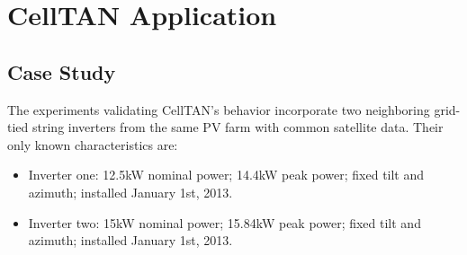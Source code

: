 \chapter{CellTAN Application} \label{chap:chap5}


\section{Case Study}


The experiments validating CellTAN's behavior incorporate two neighboring grid-tied string inverters from the same PV farm with common satellite data. Their only known characteristics are:

\begin{itemize}
    \item Inverter one: 12.5kW nominal power; 14.4kW peak power; fixed tilt and azimuth; installed January 1st, 2013.
    \item Inverter two: 15kW nominal power; 15.84kW peak power; fixed tilt and azimuth; installed January 1st, 2013.
\end{itemize}

